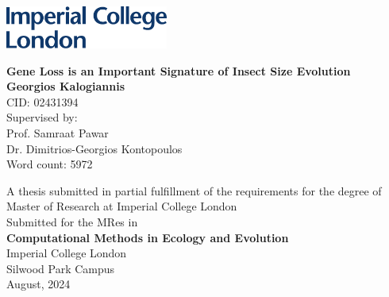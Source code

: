 \documentclass[11pt]{article}
\begin{document}
\begin{titlepage}
    \includegraphics[width=0.4\textwidth]{figures/IC_Logo-2.pdf}\\
    \begin{center}
    \vspace{1.75cm}
    \Large
        \LARGE
        \textbf{Gene Loss is an Important Signature of Insect Size Evolution}
        \Large
        \vspace{2.5cm}\\
        \textbf{Georgios Kalogiannis}\\
        CID: 02431394\\
        \vspace{2.5cm}
        \large
        Supervised by:\\
        Prof. Samraat Pawar\\
        Dr. Dimitrios-Georgios Kontopoulos\\
        \vspace{2cm}
        Word count: 5972 \\
        \vspace{1.5cm}

        
        A thesis submitted in partial fulfillment of the requirements for the degree of\\
        
        Master of Research at Imperial College London\\
        \vspace{0.75cm}
        Submitted for the MRes in\\
        \textbf{Computational Methods in Ecology and Evolution}\\
        \vspace{1.5cm}
        Imperial College London\\
        Silwood Park Campus\\
        \vspace{0.25cm}
        August, 2024
    \end{center}
\end{titlepage}
\pagebreak

\onehalfspacing
{}
\end{document}
